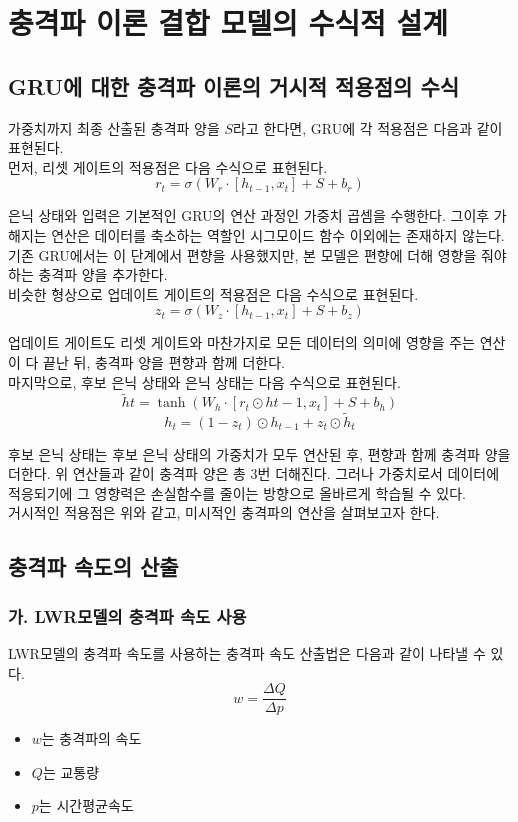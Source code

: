 \documentclass[11pt]{report}
\begin{document}
\section{충격파 이론 결합 모델의 수식적 설계}
\subsection{GRU에 대한 충격파 이론의 거시적 적용점의 수식}
가중치까지 최종 산출된 충격파 양을 $S$라고 한다면, GRU에 각 적용점은 다음과 같이 표현된다. \\
\indent 먼저, 리셋 게이트의 적용점은 다음 수식으로 표현된다. 
$$
r_t = \sigma(W_r \cdot [h_{t-1}, x_t] + S + b_r)
$$

은닉 상태와 입력은 기본적인 GRU의 연산 과정인 가중치 곱셈을 수행한다. 
그이후 가해지는 연산은 데이터를 축소하는 역할인 시그모이드 함수 이외에는 존재하지 않는다. 
기존 GRU에서는 이 단계에서 편향을 사용했지만, 본 모델은 편향에 더해 영향을 줘야하는 충격파 양을 추가한다. \\
\indent 비슷한 형상으로 업데이트 게이트의 적용점은 다음 수식으로 표현된다. 
$$
z_t = \sigma(W_z \cdot [h_{t-1}, x_t] + S + b_z)
$$

업데이트 게이트도 리셋 게이트와 마찬가지로 모든 데이터의 의미에 영향을 주는 연산이 다 끝난 뒤, 충격파 양을 편향과 함께 더한다. \\
\indent 마지막으로, 후보 은닉 상태와 은닉 상태는 다음 수식으로 표현된다. 
$$
\tilde{h}t = \tanh(W_h \cdot [r_t \odot h{t-1}, x_t] + S + b_h)
$$
$$
h_t = (1 - z_t) \odot h_{t-1} + z_t \odot \tilde{h}_t
$$

후보 은닉 상태는 후보 은닉 상태의 가중치가 모두 연산된 후, 편향과 함께 충격파 양을 더한다. 
위 연산들과 같이 충격파 양은 총 3번 더해진다. 
그러나 가중치로서 데이터에 적응되기에 그 영향력은 손실함수를 줄이는 방향으로 올바르게 학습될 수 있다. \\
\indent 거시적인 적용점은 위와 같고, 미시적인 충격파의 연산을 살펴보고자 한다. 

\subsection{충격파 속도의 산출}
\subsubsection*{가. LWR모델의 충격파 속도 사용}
LWR모델의 충격파 속도를 사용하는 충격파 속도 산출법은 다음과 같이 나타낼 수 있다. 
$$
w = \frac{\Delta Q}{\Delta p}
$$

\begin{itemize}
    \item $w$는 충격파의 속도
    \item $Q$는 교통량
    \item $p$는 시간평균속도
\end{itemize}
\end{document}
